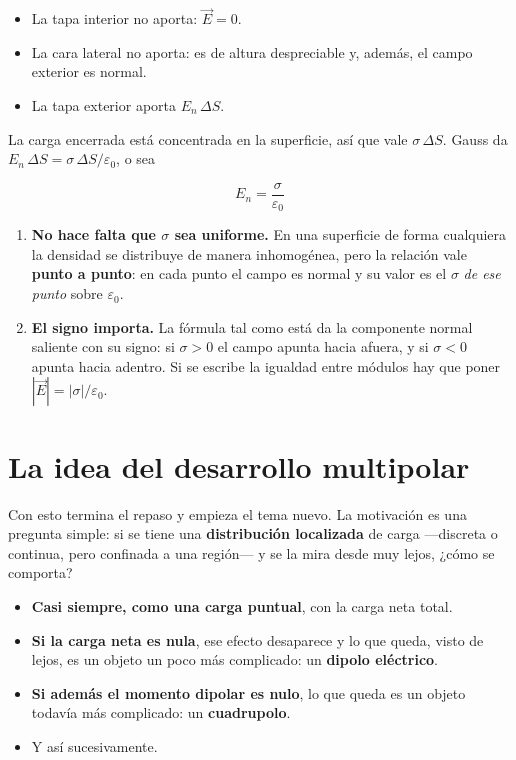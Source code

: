 \documentclass[12pt,a4paper]{article}
\begin{document}
\begin{itemize}[nosep]
  \item La tapa interior no aporta: $\vec E = 0$.
  \item La cara lateral no aporta: es de altura despreciable y, además, el campo
        exterior es normal.
  \item La tapa exterior aporta $E_n\,\Delta S$.
\end{itemize}

La carga encerrada está concentrada en la superficie, así que vale
$\sigma\,\Delta S$. Gauss da $E_n\,\Delta S = \sigma\,\Delta S/\varepsilon_0$, o
sea

\[
\boxed{\;E_n = \frac{\sigma}{\varepsilon_0}\;}
\]

\begin{notebox}
\begin{enumerate}[nosep, leftmargin=*]
  \item \textbf{No hace falta que $\sigma$ sea uniforme.} En una superficie de
        forma cualquiera la densidad se distribuye de manera inhomogénea, pero la
        relación vale \textbf{punto a punto}: en cada punto el campo es normal y
        su valor es el $\sigma$ \emph{de ese punto} sobre $\varepsilon_0$.
  \item \textbf{El signo importa.} La fórmula tal como está da la componente
        normal saliente con su signo: si $\sigma>0$ el campo apunta hacia afuera,
        y si $\sigma<0$ apunta hacia adentro. Si se escribe la igualdad entre
        módulos hay que poner $|\vec E| = |\sigma|/\varepsilon_0$.
\end{enumerate}
\end{notebox}

\section{La idea del desarrollo multipolar}

Con esto termina el repaso y empieza el tema nuevo. La motivación es una pregunta
simple: si se tiene una \textbf{distribución localizada} de carga ---discreta o
continua, pero confinada a una región--- y se la mira desde muy lejos, ¿cómo se
comporta?

\begin{itemize}[nosep]
  \item \textbf{Casi siempre, como una carga puntual}, con la carga neta total.
  \item \textbf{Si la carga neta es nula}, ese efecto desaparece y lo que queda,
        visto de lejos, es un objeto un poco más complicado: un \textbf{dipolo
        eléctrico}.
  \item \textbf{Si además el momento dipolar es nulo}, lo que queda es un objeto
        todavía más complicado: un \textbf{cuadrupolo}.
  \item Y así sucesivamente.
\end{itemize}
\end{document}
